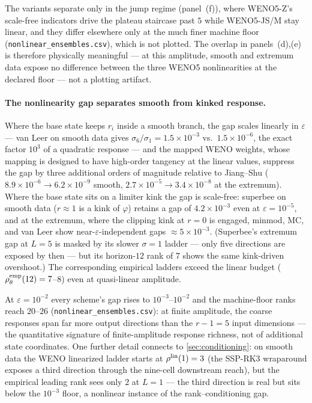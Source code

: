 \documentclass[pdflatex,sn-mathphys-num]{sn-jnl}%
\theoremstyle{thmstyleone}%
\theoremstyle{thmstyletwo}%
\theoremstyle{thmstylethree}%
\begin{document}
The variants separate only in the jump regime (panel~(f)), where WENO5-Z's scale-free indicators drive the plateau staircase past $5$ while WENO5-JS/M stay linear, and they differ elsewhere only at the much finer machine floor (\texttt{nonlinear\_ensembles.csv}), which is not plotted.
The overlap in panels~(d),(e) is therefore physically meaningful --- at this amplitude, smooth and extremum data expose no difference between the three WENO5 nonlinearities at the declared floor --- not a plotting artifact.

\paragraph{The nonlinearity gap separates smooth from kinked response.}
Where the base state keeps $r_i$ inside a smooth branch, the gap scales linearly in $\varepsilon$ --- van Leer on smooth data gives $\sigma_6/\sigma_1=1.5\times10^{-3}$ vs.\ $1.5\times10^{-6}$, the exact factor $10^3$ of a quadratic response --- and the mapped WENO weights, whose mapping is designed to have high-order tangency at the linear values, suppress the gap by three additional orders of magnitude relative to Jiang--Shu ($8.9\times10^{-6}\to6.2\times10^{-9}$ smooth, $2.7\times10^{-5}\to3.4\times10^{-8}$ at the extremum).
Where the base state sits on a limiter kink the gap is scale-free: superbee on smooth data ($r\approx1$ is a kink of $\varphi$) retains a gap of $4.2\times10^{-3}$ even at $\varepsilon=10^{-5}$, and at the extremum, where the clipping kink at $r=0$ is engaged, minmod, MC, and van Leer show near-$\varepsilon$-independent gaps $\approx5\times10^{-3}$.
(Superbee's extremum gap at $L=5$ is masked by its slower $\sigma=1$ ladder --- only five directions are exposed by then --- but its horizon-$12$ rank of $7$ shows the same kink-driven overshoot.)
The corresponding empirical ladders exceed the linear budget ($\rho^{\rm emp}_\theta(12)=7$--$8$) even at quasi-linear amplitude.

At $\varepsilon=10^{-2}$ every scheme's gap rises to $10^{-3}$--$10^{-2}$ and the machine-floor ranks reach $20$--$26$ (\texttt{nonlinear\_ensembles.csv}): at finite amplitude, the coarse responses span far more output directions than the $r-1=5$ input dimensions --- the quantitative signature of finite-amplitude response richness, not of additional state coordinates.
One further detail connects to \cref{sec:conditioning}: on smooth data the WENO linearized ladder starts at $\rho^{\rm lin}(1)=3$ (the SSP-RK3 wraparound exposes a third direction through the nine-cell downstream reach), but the empirical leading rank sees only $2$ at $L=1$ --- the third direction is real but sits below the $10^{-3}$ floor, a nonlinear instance of the rank--conditioning gap.
\end{document}
